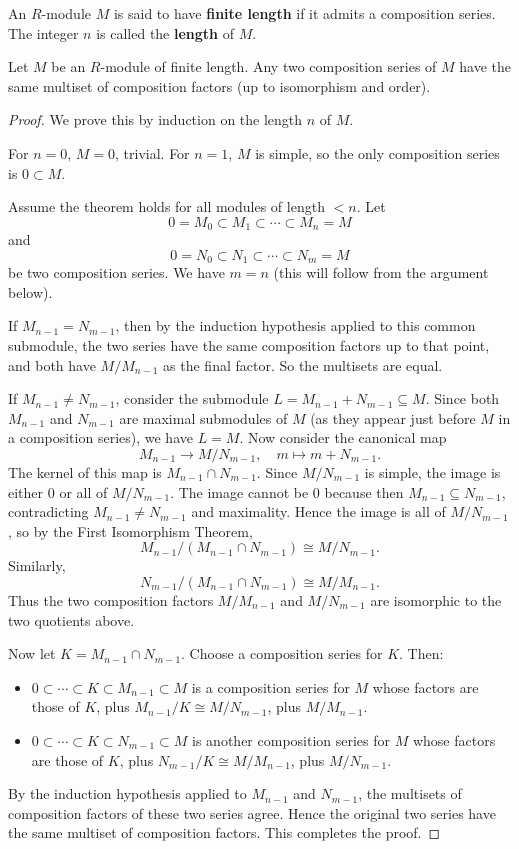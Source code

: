 \begin{defn}
An $R$-module $M$ is said to have \textbf{finite length} if it admits a composition series. The integer $n$ is called the \textbf{length} of $M$.
\end{defn}

\begin{thm}
Let $M$ be an $R$-module of finite length. Any two composition series of $M$ have the same multiset of composition factors (up to isomorphism and order).
\end{thm}

\begin{proof}
We prove this by induction on the length $n$ of $M$.

For $n = 0$, $M = 0$, trivial. For $n = 1$, $M$ is simple, so the only composition series is $0 \subset M$.

Assume the theorem holds for all modules of length $< n$. Let
\[
0 = M_0 \subset M_1 \subset \cdots \subset M_n = M
\]
and
\[
0 = N_0 \subset N_1 \subset \cdots \subset N_m = M
\]
be two composition series. We have $m = n$ (this will follow from the argument below).

If $M_{n-1} = N_{m-1}$, then by the induction hypothesis applied to this common submodule, the two series have the same composition factors up to that point, and both have $M/M_{n-1}$ as the final factor. So the multisets are equal.

If $M_{n-1} \neq N_{m-1}$, consider the submodule $L = M_{n-1} + N_{m-1} \subseteq M$. Since both $M_{n-1}$ and $N_{m-1}$ are maximal submodules of $M$ (as they appear just before $M$ in a composition series), we have $L = M$. Now consider the canonical map
\[
M_{n-1} \to M / N_{m-1}, \quad m \mapsto m + N_{m-1}.
\]
The kernel of this map is $M_{n-1} \cap N_{m-1}$. Since $M/N_{m-1}$ is simple, the image is either $0$ or all of $M/N_{m-1}$. The image cannot be $0$ because then $M_{n-1} \subseteq N_{m-1}$, contradicting $M_{n-1} \neq N_{m-1}$ and maximality. Hence the image is all of $M/N_{m-1}$, so by the First Isomorphism Theorem,
\[
M_{n-1} / (M_{n-1} \cap N_{m-1}) \cong M / N_{m-1}.
\]
Similarly,
\[
N_{m-1} / (M_{n-1} \cap N_{m-1}) \cong M / M_{n-1}.
\]
Thus the two composition factors $M/M_{n-1}$ and $M/N_{m-1}$ are isomorphic to the two quotients above.

Now let $K = M_{n-1} \cap N_{m-1}$. Choose a composition series for $K$. Then:
\begin{itemize}
    \item $0 \subset \cdots \subset K \subset M_{n-1} \subset M$ is a composition series for $M$ whose factors are those of $K$, plus $M_{n-1}/K \cong M/N_{m-1}$, plus $M/M_{n-1}$.
    \item $0 \subset \cdots \subset K \subset N_{m-1} \subset M$ is another composition series for $M$ whose factors are those of $K$, plus $N_{m-1}/K \cong M/M_{n-1}$, plus $M/N_{m-1}$.
\end{itemize}
By the induction hypothesis applied to $M_{n-1}$ and $N_{m-1}$, the multisets of composition factors of these two series agree. Hence the original two series have the same multiset of composition factors. This completes the proof.
\end{proof}

